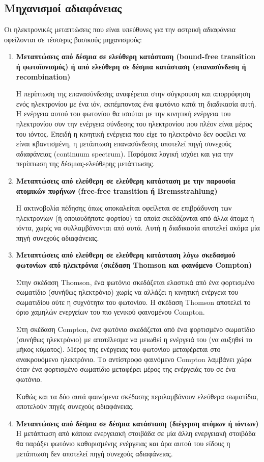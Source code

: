 \subsection{Μηχανισμοί αδιαφάνειας}
 Οι ηλεκτρονικές μεταπτώσεις που είναι υπεύθυνες για την αστρική αδιαφάνεια οφείλονται σε τέσσερις βασικούς μηχανισμούς:
\begin{enumerate}
    \item \textbf{Μεταπτώσεις από δέσμια σε ελεύθερη κατάσταση (bound-free transition ή φωτοϊονισμός) ή από ελεύθερη σε δέσμια κατάσταση (επανασύνδεση ή recombination)} 
    
    Η περίπτωση της επανασύνδεσης αναφέρεται στην σύγκρουση και απορρόφηση ενός ηλεκτρονίου με ένα ιόν, εκπέμποντας ένα φωτόνιο κατά τη διαδικασία αυτή. Η ενέργεια αυτού του φωτονίου θα ισούται με την κινητική ενέργεια του ηλεκτρονίου συν την ενέργεια σύνδεσης του ηλεκτρονίου που πλέον είναι μέρος του ιόντος. Επειδή η κινητική ενέργεια που είχε το ηλεκτρόνιο δεν οφείλει να είναι κβαντισμένη, η μετάπτωση επανασύνδεσης αποτελεί πηγή συνεχούς αδιαφάνειας (continuum spectrum). Παρόμοια λογική ισχύει και για την περίπτωση της δέσμιας-ελεύθερης μετάπτωσης.
    
    \item \textbf{Μεταπτώσεις από ελεύθερη σε ελεύθερη κατάσταση με την παρουσία ατομικών πυρήνων (free-free transition ή Bremsstrahlung)}
    
    Η ακτινοβολία πέδησης όπως αποκαλείται οφείλεται σε επιβράδυνση των ηλεκτρονίων (ή οποιουδήποτε φορτίου) τα οποία σκεδάζονται από άλλα άτομα ή ιόντα, χωρίς να συλλαμβάνονται από αυτά. Αυτή η διαδικασία αποτελεί ακόμα μία πηγή συνεχούς αδιαφάνειας.
    
    \item \textbf{Μεταπτώσεις από ελεύθερη σε ελεύθερη κατάσταση λόγω σκεδασμού φωτονίων από ηλεκτρόνια (σκέδαση Thomson και φαινόμενο Compton)}
    
    Στην σκέδαση Thomson, ένα φωτόνιο σκεδάζεται ελαστικά από ένα φορτισμένο σωματίδιο (συνήθως ηλεκτρόνιο) χωρίς να αλλάζει η κινητική ενέργεια του σωματιδίου ούτε η συχνότητα του φωτονίου. Η σκέδαση Thomson αποτελεί το όριο χαμηλών ενεργείων του πιο γενικού φαινομένου Compton.
    
    Στη σκέδαση Compton, ένα φωτόνιο σκεδάζεται από ένα φορτισμένο σωματίδιο (συνήθως ηλεκτρόνιο) με αποτέλεσμα να μειωθεί η ενέργειά του (να αυξηθεί το μήκος κύματος). Μέρος της ενέργειας του φωτονίου μεταφέρεται στο ανακρουόμενο ηλεκτρόνιο. Το αντίστροφο φαινόμενο Compton λαμβάνει χώρα όταν ένα φορτισμένο σωματίδιο μεταφέρει μέρος της ενέργειάς του σε ένα φωτόνιο.
    
    Καθώς και τα δύο αυτά φαινόμενα σκέδασης περιλαμβάνουν ελεύθερα σωματίδια, αποτελούν πηγές συνεχούς αδιαφάνειας.
    
    \item \textbf{Μεταπτώσεις από δέσμια σε δέσμια κατάσταση (διέγερση ατόμων ή ιόντων)}
    Η μετάπτωση από κάποια ενεργειακή στοιβάδα σε μία άλλη ενεργειακή στοιβάδα θα παράξει φωτόνιο καθορισμένης ενέργειας και άρα αυτού του είδους η μετάπτωση δεν αποτελεί πηγή συνεχούς αδιαφάνειας.
\end{enumerate}

